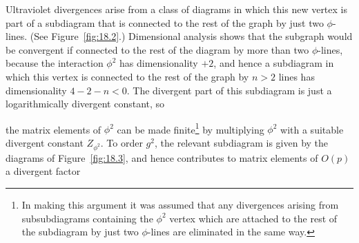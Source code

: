 



Ultraviolet divergences arise from a class of diagrams in which this new
vertex is part of a subdiagram that is connected to the rest of the graph by
just two $\phi$-lines. (See Figure~\ref{fig:18.2}.) Dimensional analysis shows
that the subgraph would be convergent if connected to the rest of the diagram
by more than two $\phi$-lines, because the interaction $\phi^2$ has
dimensionality $+2$, and hence a subdiagram in which this vertex is connected
to the rest of the graph by $n>2$ lines has dimensionality $4-2-n<0$. The
divergent part of this subdiagram is just a logarithmically divergent
constant, so



the matrix elements of $\phi^2$ can be made finite\footnote{In
making this argument it was assumed that any divergences arising from
subsubdiagrams containing the $\phi^2$ vertex which are attached to the rest
of the subdiagram by just two $\phi$-lines are eliminated in the same way.}
by multiplying $\phi^2$ with a suitable divergent constant $Z_{\phi^2}$. To
order $g^2$, the relevant subdiagram is given by the diagrams of
Figure~\ref{fig:18.3}, and hence contributes to matrix elements of $O(p)$ a
divergent factor

